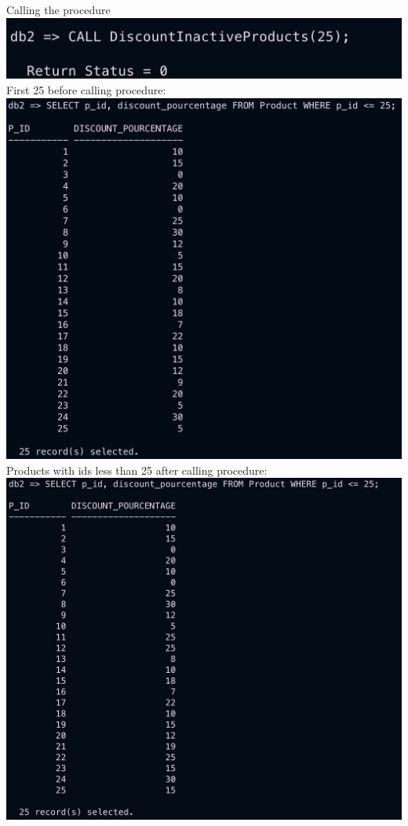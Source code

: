 \documentclass[a4paper,11pt]{article}
\begin{document}
Calling the procedure\\
\includegraphics*[width=\textwidth]{images/call_to_procedure.png}
First 25 before calling procedure:\\
\includegraphics*[width=\textwidth]{images/products_before.png}
Products with ids less than 25 after calling procedure:\\
\includegraphics*[width=\textwidth]{images/updated_table_after_procedure_call.png}
\end{document}
